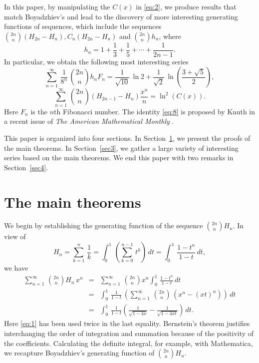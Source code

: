 \documentclass[12pt,reqno]{article}
\begin{document}
In this paper, by manipulating the $C(x)$ in \eqref{eq:2}, we produce results that match Boyadzhiev's and lead to the discovery of
more interesting generating functions of sequences, which include the sequences $\binom{2n}{n}(H_{2n} - H_n), C_n(H_{2n} - H_n)$ and $\binom{2n}{n}h_n$, where
\begin{equation}
h_n = 1+ \frac{1}{3} + \frac{1}{5} + \cdots + \frac{1}{2n-1}.
\label{eq:6}
\end{equation}
In particular, we obtain the following most interesting series
\begin{equation}
\sum_{n=1}^\infty\,\frac{1}{8^n}\,\binom{2n}{n}h_nF_n = \frac{1}{\sqrt{10}}\,\ln 2 + \frac{1}{\sqrt{2}}\,\ln\left(\frac{3 + \sqrt{5}}{2}\right),
\label{eq:7}
\end{equation}
\begin{equation}
\sum_{n=1}^\infty\,\binom{2n}{n}(H_{2n-1} - H_n)\frac{x^n}{n} = \ln^2(C(x)).
\label{eq:8}
\end{equation}
Here $F_n$ is the $n$th Fibonacci number. The identity \eqref{eq:8} is proposed by Knuth in a recent issue of {\it The American Mathematical Monthly} \cite{Knuth}. 

This paper is organized into four sections. In 
Section~\ref{sec2}, we present the proofs of the main theorems. In 
Section~\ref{sec3},
we gather a large variety of interesting series based on the main theorems. We end this paper with two remarks in Section~\ref{sec4}.

\section{The main theorems}
\label{sec2}

We begin by establishing the generating function of the sequence $\binom{2n}{n}H_n$. In view of 
$$H_n = \sum_{k=1}^n\,\frac{1}{k} = \int_0^1\,\left(\sum_{k=0}^{n-1}\,t^k\right)\,dt = \int_0^1\,\frac{1- t^n}{1-t}\,dt,$$
we have
\begin{eqnarray*}
\sum_{n=1}^\infty\,\binom{2n}{n}H_n\,x^n & = & \sum_{n=1}^\infty\,\binom{2n}{n}x^n\int_0^1\,\frac{1- t^n}{1-t}\,dt\\
& = & \int_0^1\,\frac{1}{1-t}\,\left(\sum_{n=1}^\infty\,\binom{2n}{n}\,(x^n - (xt)^n)\right)\,dt\\
& = & \int_0^1\,\frac{1}{1-t}\left(\frac{1}{\sqrt{1-4x}} - \frac{1}{\sqrt{1 -4xt}}\right)\,dt.
\end{eqnarray*}
Here \eqref{eq:1} has been used twice in the last equality. Bernstein's theorem \cite[Thm.\ 9.30, p.\ 243]{Apostol} justifies interchanging the order of integration and summation because of the positivity of the coefficients. Calculating the definite integral, for example, with Mathematica, we recapture Boyadzhiev's generating function of $\binom{2n}{n}H_n$.
\end{document}
